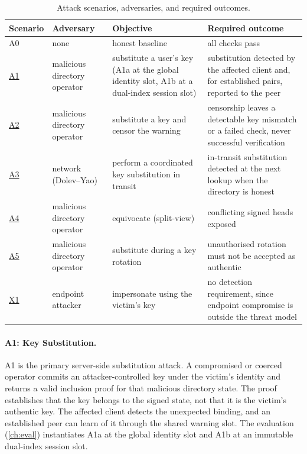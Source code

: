 \begin{table}[H]
\centering
\caption{Attack scenarios, adversaries, and required outcomes.}
\label{tab:threat-attacks}
\setlength{\extrarowheight}{2pt}
\small
\begin{tabularx}{\textwidth}{@{}ll>{\raggedright\arraybackslash}X>{\raggedright\arraybackslash}X@{}}
\toprule
Scenario & Adversary & Objective & Required outcome \\
\midrule
A0 & none & honest baseline & all checks pass \\
\hyperref[sc:threat-a1]{A1} & malicious directory operator & substitute a user's key (A1a at the global identity slot, A1b at a dual-index session slot) & substitution detected by the affected client and, for established pairs, reported to the peer \\
\hyperref[sc:threat-a2]{A2} & malicious directory operator & substitute a key and censor the warning & censorship leaves a detectable key mismatch or a failed check, never successful verification \\
\hyperref[sc:threat-a3]{A3} & network (Dolev--Yao) & perform a coordinated key substitution in transit & in-transit substitution detected at the next lookup when the directory is honest \\
\hyperref[sc:threat-a4]{A4} & malicious directory operator & equivocate (split-view) & conflicting signed heads exposed \\
\hyperref[sc:threat-a5]{A5} & malicious directory operator & substitute during a key rotation & unauthorised rotation must not be accepted as authentic \\
\hyperref[sc:threat-x1]{X1} & endpoint attacker & impersonate using the victim's key & no detection requirement, since endpoint compromise is outside the threat model \\
\bottomrule
\end{tabularx}
\end{table}

\FloatBarrier

\label{sc:threat-a1}\paragraph{A1: Key Substitution.} A1 is the primary server-side substitution attack. A
compromised or coerced operator commits an attacker-controlled key under the victim's identity
and returns a valid inclusion proof for that malicious directory state. The proof establishes
that the key belongs to the signed state, not that it is the victim's authentic key. The
affected client detects the unexpected binding, and an established peer can learn of it through
the shared warning slot. The evaluation (\cref{ch:eval}) instantiates A1a at the global
identity slot and A1b at an immutable dual-index session slot.

